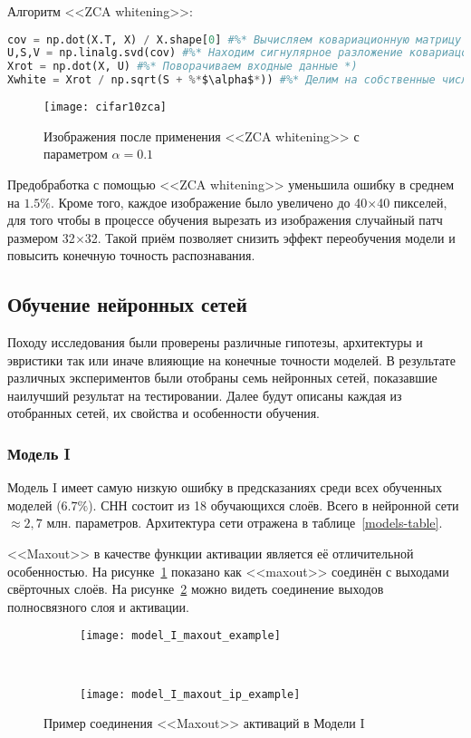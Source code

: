 Алгоритм <<ZCA whitening>>:
\begin{lstlisting}[language=Python, frame=TB]
cov = np.dot(X.T, X) / X.shape[0] #%* Вычисляем ковариационную матрицу *)
U,S,V = np.linalg.svd(cov) #%* Находим сигнулярное разложение ковариацонной матрицы *)
Xrot = np.dot(X, U) #%* Поворачиваем входные данные *)
Xwhite = Xrot / np.sqrt(S + %*$\alpha$*)) #%* Делим на собственные числа *)
\end{lstlisting}
\vspace*{-1.4cm}
\begin{figure}[h]
    \centering
    \texttt{[image: cifar10zca]}
    \caption{Изображения после применения <<ZCA whitening>> с параметром $\alpha=0.1$}
\end{figure}
Предобработка с помощью <<ZCA whitening>> уменьшила ошибку в среднем на $1.5\%$. Кроме того, каждое изображение было
увеличено до 40$\times$40 пикселей, для того чтобы в процессе обучения вырезать из 
изображения случайный патч размером 32$\times$32. Такой приём позволяет снизить эффект переобучения модели и повысить конечную 
точность распознавания.

\subsection{Обучение нейронных сетей}
Походу исследования были проверены различные гипотезы, архитектуры и эвристики так или иначе влияющие на конечные точности 
моделей. В результате различных экспериментов были отобраны семь нейронных сетей, показавшие наилучший результат на тестировании.
Далее будут описаны каждая из отобранных сетей, их свойства и особенности обучения.

\subsubsection{Модель I}
Модель I имеет самую низкую ошибку в предсказаниях среди всех обученных моделей ($6.7\%$). СНН состоит из 18 обучающихся слоёв.
Всего в нейронной сети $\approx2,7$ млн. параметров. Архитектура сети отражена в таблице~\ref{models-table}.

<<Maxout>> в качестве функции активации является её отличительной особенностью.
На рисунке~\ref{fig:model_I_maxout_example} показано как <<maxout>> соединён с выходами свёрточных слоёв. На
рисунке~\ref{fig:model_I_maxout_ip_example} можно видеть соединение выходов полносвязного слоя и активации.
\begin{figure}[h]
    \centering
    \begin{subfigure}[b]{0.5\textwidth}
        \texttt{[image: model\_I\_maxout\_example]}
        \vspace*{0.13cm}
        \subcaption{}
        \label{fig:model_I_maxout_example}
    \end{subfigure}~
    \begin{subfigure}[b]{0.5\textwidth}
        \texttt{[image: model\_I\_maxout\_ip\_example]}
        \subcaption{}
        \label{fig:model_I_maxout_ip_example}
    \end{subfigure}
    \caption{Пример соединения <<Maxout>> активаций в Модели I}
    \label{fig:maxout_model_I}
\end{figure}

